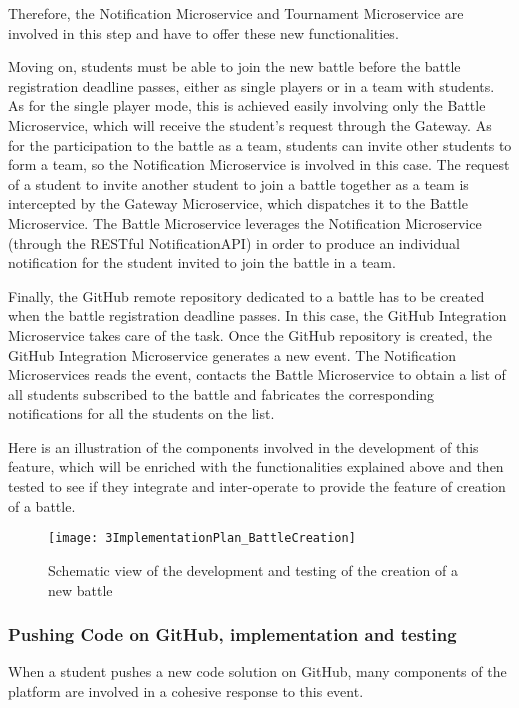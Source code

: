 Therefore, the Notification Microservice and Tournament Microservice are involved in this step and have to offer these new functionalities.

Moving on, students must be able to join the new battle before the battle registration deadline passes, either as single players or in a team with students. As for the single player mode, this is achieved easily involving only the Battle Microservice, which will receive the student's request through the Gateway.
As for the participation to the battle as a team, students can invite other students to form a team, so the Notification Microservice is involved in this case. The request of a student to invite another student to join a battle together as a team is intercepted by the Gateway Microservice, which dispatches it to the Battle Microservice. The Battle Microservice leverages the Notification Microservice (through the RESTful NotificationAPI) in order to produce an individual notification for the student invited to join the battle in a team.

Finally, the GitHub remote repository dedicated to a battle has to be created when the battle registration deadline passes. In this case, the GitHub Integration Microservice takes care of the task. Once the GitHub repository is created, the GitHub Integration Microservice generates a new event. The Notification Microservices reads the event, contacts the Battle Microservice to obtain a list of all students subscribed to the battle and fabricates the corresponding notifications for all the students on the list.

Here is an illustration of the components involved in the development of this feature, which will be enriched with the functionalities explained above and then tested to see if they integrate and inter-operate to provide the feature of creation of a battle.

\begin{figure}[h]
        \centering
	\texttt{[image: 3ImplementationPlan\_BattleCreation]}
        \caption{Schematic view of the development and testing of the creation of a new battle}
\end{figure}

\newpage
\subsubsection*{Pushing Code on GitHub, implementation and testing}

When a student pushes a new code solution on GitHub, many components of the \app platform are involved in a cohesive response to this event.

